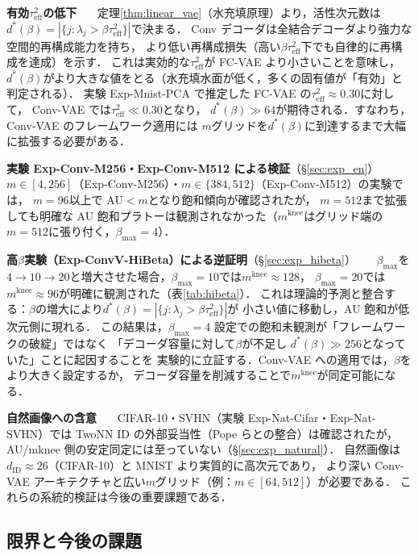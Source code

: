 \documentclass[11pt,a4paper]{jsarticle}
\newcommand{\mknee}{m^{\mathrm{knee}}}
\begin{document}
\textbf{有効$\tau^2_\mathrm{eff}$の低下}~~~
定理\ref{thm:linear_vae}（水充填原理）より，活性次元数は
$d^*(\beta) = |\{j : \lambda_j > \beta\tau^2_\mathrm{eff}\}|$で決まる．
Conv デコーダは全結合デコーダより強力な空間的再構成能力を持ち，
より低い再構成損失（高い$\beta\tau^2_\mathrm{eff}$下でも自律的に再構成を達成）を示す．
これは実効的な$\tau^2_\mathrm{eff}$が FC-VAE より小さいことを意味し，
$d^*(\beta)$がより大きな値をとる（水充填水面が低く，多くの固有値が「有効」と判定される）．
実験 Exp-Mnist-PCA で推定した FC-VAE の$\tau^2_\mathrm{eff} \approx 0.30$に対して，
Conv-VAE では$\tau^2_\mathrm{eff} \ll 0.30$となり，
$d^*(\beta) \gg 64$が期待される．すなわち，Conv-VAE のフレームワーク適用には
$m$グリッドを$d^*(\beta)$に到達するまで大幅に拡張する必要がある．

\textbf{実験 Exp-Conv-M256・Exp-Conv-M512 による検証}（§\ref{sec:exp_en}）~~~
$m \in [4,256]$（Exp-Conv-M256）・$m \in \{384,512\}$（Exp-Conv-M512）の実験では，
$m = 96$以上で AU$<m$となり飽和傾向が確認されたが，
$m=512$まで拡張しても明確な AU 飽和プラトーは観測されなかった（$\mknee$はグリッド端の$m=512$に張り付く，$\beta_{\max}=4$）．

\textbf{高$\beta$実験（Exp-ConvV-HiBeta）による逆証明}（§\ref{sec:exp_hibeta}）~~~
$\beta_{\max}$を$4\to10\to20$と増大させた場合，$\beta_{\max}=10$では$\mknee \approx 128$，
$\beta_{\max}=20$では$\mknee \approx 96$が明確に観測された（表\ref{tab:hibeta}）．
これは理論的予測と整合する：$\beta$の増大により$d^*(\beta) = |\{j: \lambda_j > \beta\tau^2_\mathrm{eff}\}|$が
小さい値に移動し，AU 飽和が低次元側に現れる．
この結果は，$\beta_{\max}=4$ 設定での飽和未観測が「フレームワークの破綻」ではなく
「デコーダ容量に対して$\beta$が不足し $d^*(\beta) \gg 256$となっていた」ことに起因することを
実験的に立証する．Conv-VAE への適用では，$\beta$をより大きく設定するか，
デコーダ容量を削減することで$\mknee$が同定可能になる．


\textbf{自然画像への含意}~~~
CIFAR-10・SVHN（実験 Exp-Nat-Cifar・Exp-Nat-SVHN）では TwoNN ID の外部妥当性（Pope ら\cite{pope2021intrinsic}との整合）は確認されたが，
AU/mknee 側の安定同定には至っていない（§\ref{sec:exp_natural}）．
自然画像は$d_\mathrm{ID} \approx 26$（CIFAR-10）と MNIST より実質的に高次元であり，
より深い Conv-VAE アーキテクチャと広い$m$グリッド（例：$m \in [64, 512]$）が必要である．
これらの系統的検証は今後の重要課題である．

\subsection{限界と今後の課題}\label{sec:disc_limitation}
\end{document}
